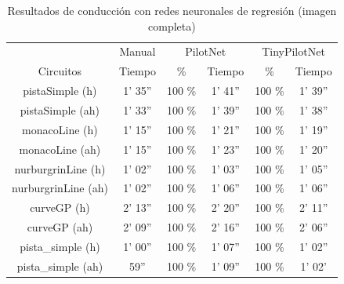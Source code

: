 \begin{table}[H]
\centering
\caption{Resultados de conducción con redes neuronales de regresión (imagen completa)}
\label{resultados_regresion_completa}
\begin{tabular}{c|c|c|c|c|c|}
\cline{2-6}
                          & \multicolumn{1}{c|}{Manual} & \multicolumn{2}{c|}{PilotNet} & \multicolumn{2}{c|}{TinyPilotNet} \\ \cline{1-6} 
                        \multicolumn{1}{|c|}{Circuitos}    & Tiempo       & \%       & Tiempo       & \%        & Tiempo         \\ \hline
\multicolumn{1}{|c|}{pistaSimple (h)}    & 1' 35''           & 100 \%         & 1' 41''       &  100 \%        & 1' 39''               \\ \hline
\multicolumn{1}{|c|}{pistaSimple (ah)}     & 1' 33''           & 100 \%          & 1' 39''           & 100 \%        & 1' 38''      \\ \hline
\multicolumn{1}{|c|}{monacoLine (h)}      & 1' 15''           & 100 \%            & 1' 21''            & 100 \%         & 1' 19''                \\ \hline
\multicolumn{1}{|c|}{monacoLine (ah)}       & 1' 15''       &  100 \%      & 1' 23''         & 100 \%          & 1' 20''         \\ \hline
\multicolumn{1}{|c|}{nurburgrinLine (h)}      & 1' 02''       &  100 \%         & 1' 03''           & 100 \%        & 1' 05''       \\ \hline
\multicolumn{1}{|c|}{nurburgrinLine (ah)}       & 1' 02''     & 100 \%         & 1' 06''          & 100 \%     & 1' 06''            \\ \hline
\multicolumn{1}{|c|}{curveGP (h)}     & 2' 13''           & 100 \%         & 2' 20''            & 100 \%        & 2' 11''             \\ \hline
\multicolumn{1}{|c|}{curveGP (ah)}       & 2' 09''            & 100 \%         & 2' 16''        & 100 \%        & 2' 06''        \\ \hline
\multicolumn{1}{|c|}{pista\_simple (h)}       & 1' 00''           & 100 \%       & 1' 07''            & 100 \%         & 1' 02''        \\ \hline
\multicolumn{1}{|c|}{pista\_simple (ah)}     & 59''          & 100 \%       & 1' 09''         & 100 \%        & 1' 02'                 \\ \hline
\end{tabular}
\end{table}



